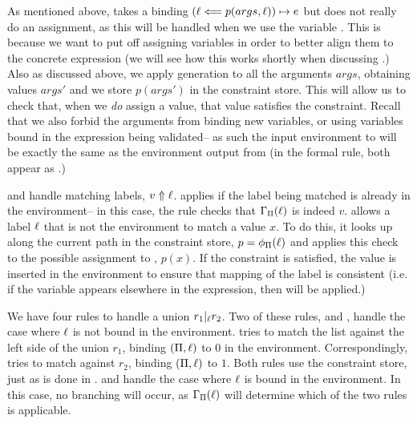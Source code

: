 
As mentioned above,
\ValidateAssignment
takes a binding
$(\ell \Longleftarrow p(args, \ell)) \mapsto e$
but does not really do an assignment,
as this will be handled when we use the variable \lab.
This is because we want to put off assigning variables
in order to better align them to the concrete expression
(we will see how this works shortly when discussing \ValidateVarTwo.)
Also as discussed above,
we apply generation \gens to all the arguments $args$,
obtaining values $args'$
and we store $p(args')$ in the constraint store.
This will allow us to check that,
when we \textit{do} assign \lab a value,
that value satisfies the constraint.
Recall that we also forbid the arguments from binding new variables,
or using variables bound in the expression being validated--
as such the input environment to \gens will be exactly the same as the environment output from \gens
(in the formal rule, both appear as \env.)

\ValidateVarOne and \ValidateVarTwo
handle matching labels, $v \Uparrow \ell$.
\ValidateVarOne applies if the label being matched
is already in the environment--
in this case,
the rule checks that $\Gamma_\Pi(\ell)$ is indeed $v$.
\ValidateVarTwo allows a label $\ell$ that is not the environment
to match a value $x$.
To do this, it looks up \lab along the current path in the constraint store,
$p = \phi_\Pi(\ell)$ and applies this check to the possible assignment to \lab,
$p(x)$.
If the constraint is satisfied,
the value is inserted in the environment to ensure that
mapping of the label is consistent
(i.e. if the variable appears elsewhere in the expression, then \ValidateVarOne will be applied.)

We have four rules to handle a union $r_1 |_\ell r_2$.
Two of these rules,
\ValidateUnionSolveLeft and \ValidateUnionSolveRight,
handle the case where $\ell$ is not bound in the environment.
\ValidateUnionSolveLeft tries to match
the list against the left side of the union $r_1$,
binding $(\Pi, \ell)$ to $0$ in the environment.
Correspondingly,
\ValidateUnionSolveRight tries to match against $r_2$,
binding $(\Pi, \ell)$ to $1$.
Both rules use the constraint store, just as is done in \ValidateVarTwo.
\ValidateUnionLeft and \ValidateUnionRight
handle the case where $\ell$ is bound in
the environment.
In this case, no branching will occur,
as $\Gamma_\Pi(\ell)$
will determine which of the two rules is applicable. 

